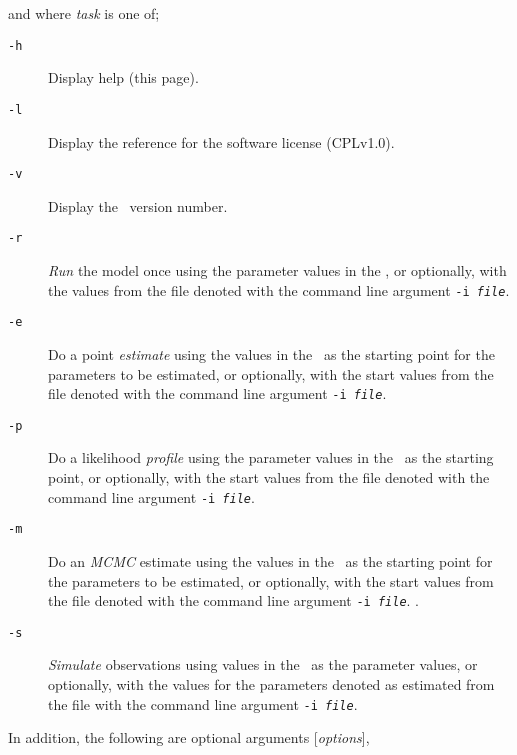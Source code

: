 and where \emph{task} is one of;
\begin{description}
\item [\texttt{-h}]  Display help (this page).
\item [\texttt{-l}] Display the reference for the software license (CPLv1.0).
\item [\texttt{-v}] Display the \SPM\ version number.

\item [\texttt{-r}] \emph{Run} the model once using the parameter values in the \config, or optionally, with the values from the file denoted with the command line argument \texttt{-i \emph{file}}.

\item [\texttt{-e}] Do a point \emph{estimate} using the values in the \config\ as the starting point for the parameters to be estimated, or optionally, with the start values from the file denoted with the command line argument \texttt{-i \emph{file}}.

\item [\texttt{-p}] Do a likelihood \emph{profile} using the parameter values in the \config\ as the starting point, or optionally, with the start values from the file denoted with the command line argument \texttt{-i \emph{file}}.

\item [\texttt{-m}] Do an \emph{MCMC} estimate using the values in the \config\ as the starting point for the parameters to be estimated, or optionally, with the start values from the file denoted with the command line argument \texttt{-i \emph{file}}. \NYI.


\item [\texttt{-s}] \emph{Simulate} observations using values in the \config\ as the parameter values, or optionally, with the values for the parameters denoted as estimated from the file with the command line argument \texttt{-i \emph{file}}.

\end{description}

In addition, the following are optional arguments [\emph{options}],

